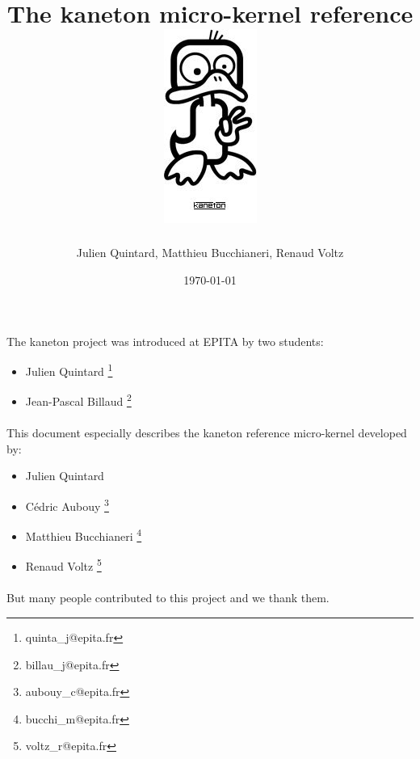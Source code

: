 \documentclass[12pt,a4wide]{report}
\date{\scriptsize{\today}}
\title{\huge{The kaneton micro-kernel reference}
\\\vspace{2cm}\includegraphics{logo.jpg}}
\author{\small{Julien Quintard}, \small{Matthieu Bucchianeri},
\small{Renaud Voltz}\vspace{2cm}}
\newcommand{\kaneton}{kaneton\xspace}
\begin{document}
%
%

\maketitle

%
%

%
%

\newpage

\paragraph{}
The \kaneton project was introduced at EPITA by two students:

\begin{itemize}
\item Julien Quintard \footnote{quinta\_j@epita.fr}
\item Jean-Pascal Billaud \footnote{billau\_j@epita.fr}
\end{itemize}

\paragraph{}
This document especially describes the kaneton reference micro-kernel
developed by:

\begin{itemize}
\item Julien Quintard
\item C\'edric Aubouy \footnote{aubouy\_c@epita.fr}
\item Matthieu Bucchianeri \footnote{bucchi\_m@epita.fr}
\item Renaud Voltz \footnote{voltz\_r@epita.fr}
\end{itemize}

\paragraph{}
But many people contributed to this project and we thank them.

%
%

\tableofcontents

%
%











%
%
\end{document}
